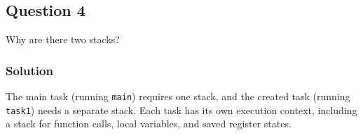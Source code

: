 \subsection*{Question 4}

Why are there two stacks?

\subsubsection*{Solution}

The main task (running \texttt{main}) requires one stack, and the created task (running \texttt{task1}) needs a separate stack.
Each task has its own execution context, including a stack for function calls, local variables, and saved register states.
